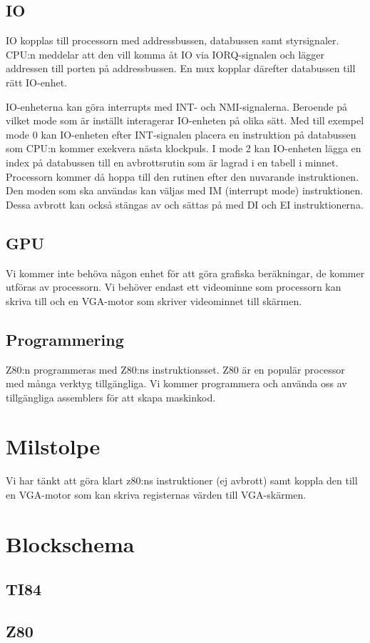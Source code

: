 \documentclass[12pt]{article}
\begin{document}
\subsection{IO}
IO kopplas till processorn med addressbussen, databussen samt styrsignaler.
CPU:n meddelar att den vill komma åt IO via IORQ-signalen och lägger addressen
till porten på addressbussen. En mux kopplar därefter databussen till rätt
IO-enhet. 

IO-enheterna kan göra interrupts med INT- och NMI-signalerna. Beroende på
vilket mode som är inställt interagerar IO-enheten på olika sätt. Med till
exempel mode 0 kan IO-enheten efter INT-signalen placera en instruktion på
databussen som CPU:n kommer exekvera nästa klockpuls. I mode 2 kan IO-enheten
lägga en index på databussen till en avbrottsrutin som är lagrad i en tabell i
minnet. Processorn kommer då hoppa till den rutinen efter den nuvarande
instruktionen. Den moden som ska användas kan väljas med IM (interrupt mode)
instruktionen. Dessa avbrott kan också stängas av och sättas på med DI och EI
instruktionerna.

\subsection{GPU}
Vi kommer inte behöva någon enhet för att göra grafiska beräkningar, de kommer
utföras av processorn. Vi behöver endast ett videominne som processorn kan
skriva till och en VGA-motor som skriver videominnet till skärmen.

\subsection{Programmering}
Z80:n programmeras med Z80:ns instruktionsset. Z80 är en populär processor med
många verktyg tillgängliga. Vi kommer programmera och använda oss av
tillgängliga assemblers för att skapa maskinkod.

\section{Milstolpe}
Vi har tänkt att göra klart z80:ns instruktioner (ej avbrott) samt koppla den
till en VGA-motor som kan skriva registernas värden till VGA-skärmen.

\section{Blockschema}
\subsection{TI84}
\begin{figure}[H]
    \centering
    \def\svgwidth{0.9\columnwidth}
    
\end{figure}
\subsection{Z80}
\begin{figure}[H]
    \centering
    \def\svgwidth{0.87\columnwidth}
    
\end{figure}
\end{document}
